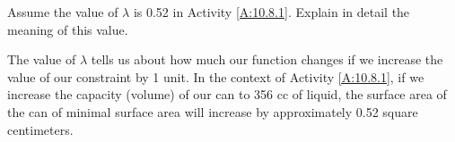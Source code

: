 \begin{activity} \label{A:10.8.3} Assume the value of $\lambda$ is 0.52 in Activity \ref{A:10.8.1}. Explain in detail the meaning of this value.

\end{activity}
\begin{smallhint}

\end{smallhint}
\begin{bighint}

\end{bighint}
\begin{activitySolution}
The value of $\lambda$ tells us about how much our function changes if we increase the value of our constraint by 1 unit. In the context of Activity \ref{A:10.8.1}, if we increase the capacity (volume) of our can to 356 cc of liquid, the surface area of the can of minimal surface area will increase by approximately 0.52 square centimeters.
\end{activitySolution}
\aftera
